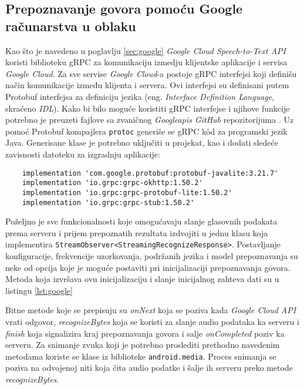 \documentclass[struktura.tex]{subfiles}
\begin{document}
\subsection{Prepoznavanje govora pomoću Google računarstva u oblaku}
Kao što je navedeno u poglavlju \ref{sec:google} \textit{Google Cloud Speech-to-Text API} koristi biblioteku gRPC za komunikaciju izmedju klijentske aplikacije i servisa \textit{Google Cloud}. Za sve servise \textit{Google Cloud}-a postoje gRPC interfejsi koji definišu način komunikacije između klijenta i servera. Ovi interfejsi su definisani putem Protobuf interfejsa za definiciju jezika (eng. \textit{Interface Definition Language}, skraćeno \textit{IDL}). Kako bi bilo moguće koristiti gRPC interfejse i njihove funkcije potrebno je preuzeti fajlove sa zvaničnog \textit{Googleapis GitHub} repozitorijuma \cite{sajt:googleApisGit}. Uz pomoć Protobuf kompajlera \verb|protoc| generiše se gRPC k\^{o}d za programski jezik Java. Generisane klase je potrebno uključiti u projekat, kao i dodati sledeće zavisnosti datoteku za izgradnju aplikacije:
\begin{verbatim}
    implementation 'com.google.protobuf:protobuf-javalite:3.21.7'
    implementation 'io.grpc:grpc-okhttp:1.50.2'
    implementation 'io.grpc:grpc-protobuf-lite:1.50.2'
    implementation 'io.grpc:grpc-stub:1.50.2' 
\end{verbatim}

Poželjno je sve funkcionalnosti koje omogućavaju slanje glasovnih podakata prema serveru i prijem prepoznatih rezultata izdvojiti u jednu klasu koja implementira \verb|StreamObserver<StreamingRecognizeResponse>|. Postavljanje konfiguracije, frekvencije uzorkovanja, podržanih jezika i model prepoznavanja su neke od opcija koje je moguće postaviti pri inicijalizaciji prepoznavanja govora. Metoda koja izvršava ovu inicijalizaciju i slanje inicijalnog zahteva dati su u listingu \ref{lst:google}




Bitne metode koje se prepisuju su \textit{onNext} koja se poziva kada \textit{Google Cloud API} vrati odgovor, \textit{recognizeBytes} koja se koristi za slanje audio podataka ka serveru i \textit{finish} koja signalizira kraj prepoznavanja govora i salje \textit{onCompleted} poziv ka serveru. Za snimanje zvuka koji je potrebno proslediti prethodno navedenim metodama koriste se klase iz biblioteke \verb|android.media|. Proces snimanja se poziva na odvojenoj niti koja čita audio podatke i šalje ih serveru preko metode \textit{recognizeBytes}.
\end{document}
